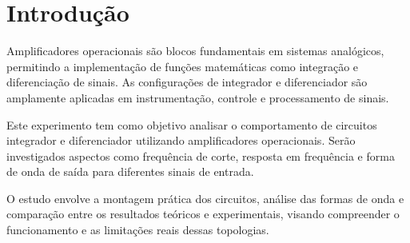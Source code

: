 \section{Introdução}

Amplificadores operacionais são blocos fundamentais em sistemas analógicos, permitindo a implementação de funções matemáticas como integração e diferenciação de sinais. As configurações de integrador e diferenciador são amplamente aplicadas em instrumentação, controle e processamento de sinais.

Este experimento tem como objetivo analisar o comportamento de circuitos integrador e diferenciador utilizando amplificadores operacionais. Serão investigados aspectos como frequência de corte, resposta em frequência e forma de onda de saída para diferentes sinais de entrada.

O estudo envolve a montagem prática dos circuitos, análise das formas de onda e comparação entre os resultados teóricos e experimentais, visando compreender o funcionamento e as limitações reais dessas topologias.
